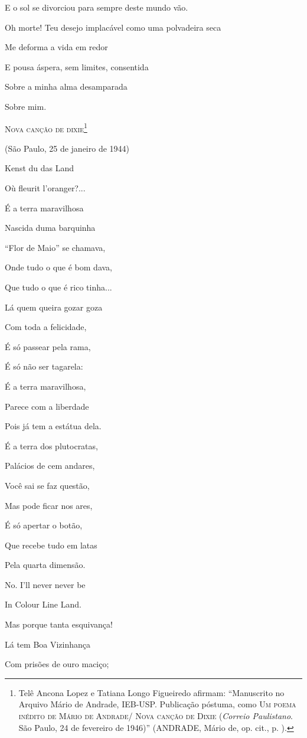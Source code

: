 E o sol se divorciou para sempre deste mundo vão.

Oh morte! Teu desejo implacável como uma polvadeira seca

Me deforma a vida em redor

E pousa áspera, sem limites, consentida

Sobre a minha alma desamparada

Sobre mim.

\textsc{Nova canção de dixie}\footnote{Telê Ancona Lopez e Tatiana Longo
  Figueiredo afirmam: ``Manuscrito no Arquivo Mário de Andrade, IEB-USP.
  Publicação póstuma, como \textsc{Um poema inédito de Mário de Andrade/
  Nova canção de Dixie} (\emph{Correio Paulistano}. São Paulo, 24 de
  fevereiro de 1946)'' (ANDRADE, Mário de, op. cit., p. ).}

(São Paulo, 25 de janeiro de 1944)

Kenst du das Land

Où fleurit l'oranger?...

É a terra maravilhosa

Nascida duma barquinha

``Flor de Maio'' se chamava,

Onde tudo o que é bom dava,

Que tudo o que é rico tinha...

Lá quem queira gozar goza

Com toda a felicidade,

É só passear pela rama,

É só não ser tagarela:

É a terra maravilhosa,

Parece com a liberdade

Pois já tem a estátua dela.

É a terra dos plutocratas,

Palácios de cem andares,

Você sai se faz questão,

Mas pode ficar nos ares,

É só apertar o botão,

Que recebe tudo em latas

Pela quarta dimensão.

No. I'll never never be

In Colour Line Land.

Mas porque tanta esquivança!

Lá tem Boa Vizinhança

Com prisões de ouro maciço;

